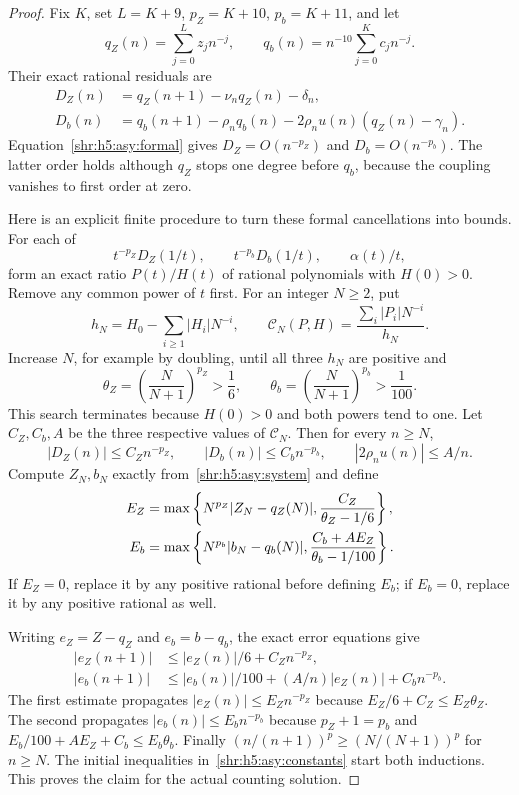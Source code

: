 \documentclass[11pt,letterpaper]{article}
\numberwithin{equation}{section}
\theoremstyle{definition}
\newcommand{\1}{\mathbf 1}
\begin{document}
\begin{proof}
Fix $K$, set $L=K+9$, $p_Z=K+10$, $p_b=K+11$, and let
\[
 q_Z(n)=\sum_{j=0}^Lz_jn^{-j},\qquad
 q_b(n)=n^{-10}\sum_{j=0}^Kc_jn^{-j}.
\]
Their exact rational residuals are
\begin{align*}
 D_Z(n)&=q_Z(n+1)-\nu_nq_Z(n)-\delta_n,\\
 D_b(n)&=q_b(n+1)-\rho_nq_b(n)
                   -2\rho_nu(n)(q_Z(n)-\gamma_n).
\end{align*}
Equation~\eqref{shr:h5:asy:formal} gives $D_Z=O(n^{-p_Z})$ and
$D_b=O(n^{-p_b})$. The latter order holds although $q_Z$ stops one degree
before $q_b$, because the coupling vanishes to first order at zero.

Here is an explicit finite procedure to turn these formal cancellations
into bounds. For each of
\[
 t^{-p_Z}D_Z(1/t),\qquad t^{-p_b}D_b(1/t),\qquad \alpha(t)/t,
\]
form an exact ratio $P(t)/H(t)$ of rational polynomials with $H(0)>0$.
Remove any common power of $t$ first. For an integer $N\ge2$, put
\begin{equation}
 h_N=H_0-\sum_{i\ge1}|H_i|N^{-i},\qquad
 \mathcal C_N(P,H)=\frac{\sum_i|P_i|N^{-i}}{h_N}.
 \label{shr:h5:asy:rationalbound}
\end{equation}
Increase $N$, for example by doubling, until all three $h_N$ are positive
and
\[
 \theta_Z=\left(\frac N{N+1}\right)^{p_Z}>\frac16,
 \qquad
 \theta_b=\left(\frac N{N+1}\right)^{p_b}>\frac1{100}.
\]
This search terminates because $H(0)>0$ and both powers tend to one.
Let $C_Z,C_b,A$ be the three respective values of
$\mathcal C_N$. Then for every $n\ge N$,
\[
 |D_Z(n)|\le C_Zn^{-p_Z},\qquad
 |D_b(n)|\le C_bn^{-p_b},\qquad
 |2\rho_nu(n)|\le A/n.
\]
Compute $Z_N,b_N$ exactly from~\eqref{shr:h5:asy:system} and define
\begin{align}
 E_Z&=\max\left\{N^{p_Z}|Z_N-q_Z(N)|,
                       \frac{C_Z}{\theta_Z-1/6}\right\},\notag\\
 E_b&=\max\left\{N^{p_b}|b_N-q_b(N)|,
                       \frac{C_b+AE_Z}{\theta_b-1/100}\right\}.
 \label{shr:h5:asy:constants}
\end{align}
If $E_Z=0$, replace it by any positive rational before defining $E_b$;
if $E_b=0$, replace it by any positive rational as well.

Writing $e_Z=Z-q_Z$ and $e_b=b-q_b$, the exact error equations give
\begin{align*}
 |e_Z(n+1)|&\le |e_Z(n)|/6+C_Zn^{-p_Z},\\
 |e_b(n+1)|&\le |e_b(n)|/100+(A/n)|e_Z(n)|+C_bn^{-p_b}.
\end{align*}
The first estimate propagates $|e_Z(n)|\le E_Zn^{-p_Z}$ because
$E_Z/6+C_Z\le E_Z\theta_Z$. The second propagates
$|e_b(n)|\le E_bn^{-p_b}$ because $p_Z+1=p_b$ and
$E_b/100+AE_Z+C_b\le E_b\theta_b$.
Finally $(n/(n+1))^{p}\ge(N/(N+1))^{p}$ for $n\ge N$.
The initial inequalities in~\eqref{shr:h5:asy:constants} start both inductions.
This proves the claim for the actual counting solution.
\end{proof}
\end{document}
